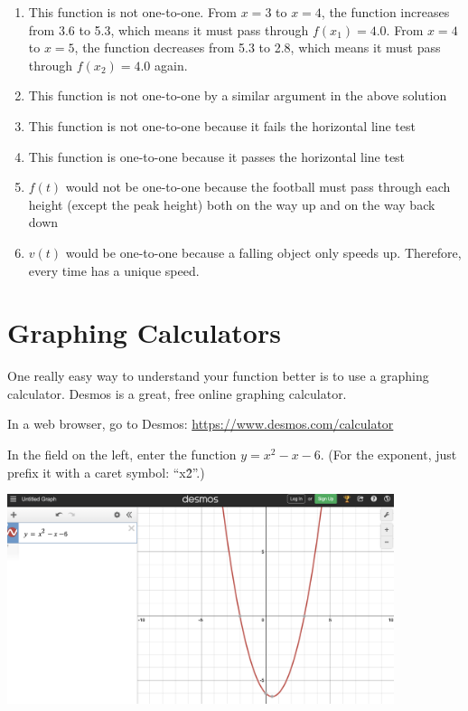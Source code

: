 \begin{Answer}[ref=invfunc1]
	\begin{enumerate}
	\item This function is not one-to-one. From $x=3$ to $x=4$, the 
	function increases from 3.6 to 5.3, which means it must pass through 
	$f(x_1)=4.0$. From $x=4$ to $x=5$, the function decreases from 5.3 to 
	2.8, which means it must pass through $f(x_2) = 4.0$ again. 
	\item This function is not one-to-one by a similar argument in the 
	above solution
	\item This function is not one-to-one because it fails the horizontal 
	line test
	\item This function is one-to-one because it passes the horizontal 
	line test
	\item $f(t)$ would not be one-to-one because the football must pass 
	through each height (except the peak height) both on the way up and 
	on the way back down
	\item $v(t)$ would be one-to-one because a falling object only speeds 
	up. Therefore, every time has a unique speed. 
	\end{enumerate}
\end{Answer}

\section{Graphing Calculators}

One really easy way to understand your function better is to use a graphing
calculator. Desmos is a great, free online graphing calculator. 

In a web browser, go to Desmos: \url{https://www.desmos.com/calculator}

In the field on the left, enter the function $y = x^2 - x - 6$. (For
the exponent, just prefix it with a caret symbol: ``x\^2''.)

\includegraphics[width=0.85\textwidth]{Desmos.png}
